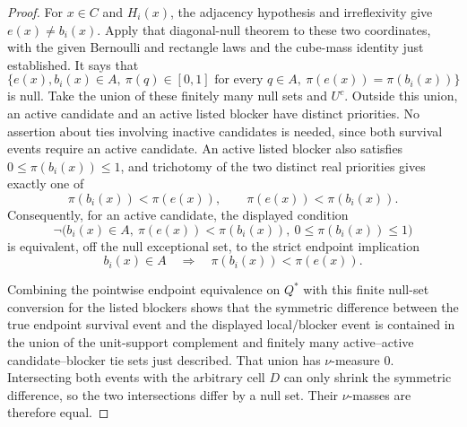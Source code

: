 \begin{proof}
For \(x\in C\) and \(H_i(x)\), the adjacency hypothesis and
irreflexivity give \(e(x)\ne b_i(x)\).  Apply that diagonal-null theorem
to these two coordinates, with the given Bernoulli and rectangle laws and
the cube-mass identity just established.  It says that
\[
 \{e(x),b_i(x)\in A,\ \pi(q)\in[0,1]\text{ for every }q\in A,
       \ \pi(e(x))=\pi(b_i(x))\}
\]
is null.  Take the union of these finitely many null sets and \(U^c\).
Outside this union, an active candidate and an active listed blocker have
distinct priorities.  No assertion about ties involving inactive candidates
is needed, since both survival events require an active candidate.
An active listed blocker also satisfies
\(0\le\pi(b_i(x))\le1\), and trichotomy of the two distinct real priorities
gives exactly one of
\[
  \pi(b_i(x))<\pi(e(x)),\qquad
  \pi(e(x))<\pi(b_i(x)).
\]
Consequently, for an active candidate, the displayed condition
\[
\neg\bigl(b_i(x)\in A,\ \pi(e(x))<\pi(b_i(x)),\
0\le\pi(b_i(x))\le1\bigr)
\]
is equivalent, off the null exceptional set, to the strict endpoint implication
\[
  b_i(x)\in A \quad\Longrightarrow\quad \pi(b_i(x))<\pi(e(x)).
\]

Combining the pointwise endpoint equivalence on \(Q^*\) with this finite
null-set conversion for the listed blockers shows that the symmetric difference
between the true endpoint survival event and the displayed local/blocker event
is contained in the union of the unit-support complement and finitely many
active--active candidate--blocker tie sets just described.
That union has \(\nu\)-measure \(0\).
Intersecting both events with the arbitrary cell \(D\) can only shrink the
symmetric difference, so the two intersections differ by a null set.  Their
\(\nu\)-masses are therefore equal.
\end{proof}
